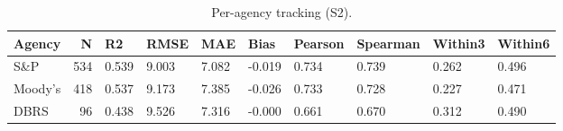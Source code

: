\begin{table}

\caption{\label{tab:tab:per_agency_tracking}Per-agency tracking (S2).}
\centering
\begin{tabular}[t]{lrllllllll}
\toprule
Agency & N & R2 & RMSE & MAE & Bias & Pearson & Spearman & Within3 & Within6\\
\midrule
S\&P & 534 & 0.539 & 9.003 & 7.082 & -0.019 & 0.734 & 0.739 & 0.262 & 0.496\\
Moody's & 418 & 0.537 & 9.173 & 7.385 & -0.026 & 0.733 & 0.728 & 0.227 & 0.471\\
DBRS & 96 & 0.438 & 9.526 & 7.316 & -0.000 & 0.661 & 0.670 & 0.312 & 0.490\\
\bottomrule
\end{tabular}
\end{table}
